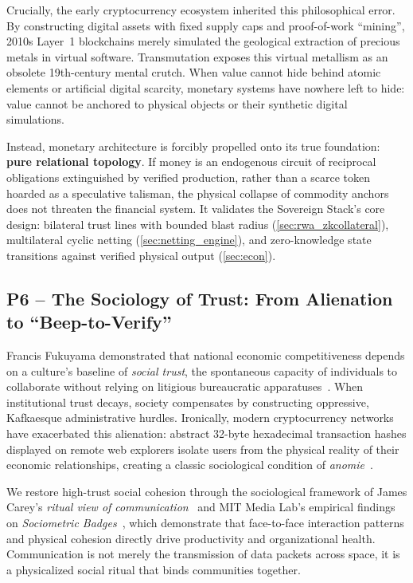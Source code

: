 \documentclass[a4paper,11pt,twoside,parskip=half-,headings=small]{scrartcl}
\begin{document}
Crucially, the early cryptocurrency ecosystem inherited this philosophical error. By constructing digital assets with fixed supply caps and proof-of-work ``mining'', 2010s Layer~1 blockchains merely simulated the geological extraction of precious metals in virtual software. Transmutation exposes this virtual metallism as an obsolete 19th-century mental crutch. When value cannot hide behind atomic elements or artificial digital scarcity, monetary systems have nowhere left to hide: value cannot be anchored to physical objects or their synthetic digital simulations.

Instead, monetary architecture is forcibly propelled onto its true foundation: \textbf{pure relational topology}. If money is an endogenous circuit of reciprocal obligations extinguished by verified production, rather than a scarce token hoarded as a speculative talisman, the physical collapse of commodity anchors does not threaten the financial system. It validates the Sovereign Stack's core design: bilateral trust lines with bounded blast radius (\cref{sec:rwa_zkcollateral}), multilateral cyclic netting (\cref{sec:netting_engine}), and zero-knowledge state transitions against verified physical output (\cref{sec:econ}).

\subsection{P6 -- The Sociology of Trust: From Alienation to ``Beep-to-Verify''}

Francis Fukuyama demonstrated that national economic competitiveness depends on a
culture's baseline of \emph{social trust}, the spontaneous capacity of individuals
to collaborate without relying on litigious bureaucratic apparatuses~\cite{fukuyama1995trust}.
When institutional trust decays, society compensates by constructing oppressive,
Kafkaesque administrative hurdles. Ironically, modern cryptocurrency networks
have exacerbated this alienation: abstract 32-byte hexadecimal transaction hashes
displayed on remote web explorers isolate users from the physical reality of their
economic relationships, creating a classic sociological condition of \emph{anomie}~\cite{durkheim1893}.

We restore high-trust social cohesion through the sociological framework of
James Carey's \emph{ritual view of communication}~\cite{carey1989communication} and MIT Media Lab's empirical findings on \emph{Sociometric Badges}~\cite{waber2010}, which demonstrate that face-to-face interaction patterns and physical cohesion directly drive productivity and organizational health. Communication
is not merely the transmission of data packets across space, it is a physicalized
social ritual that binds communities together.
\end{document}
